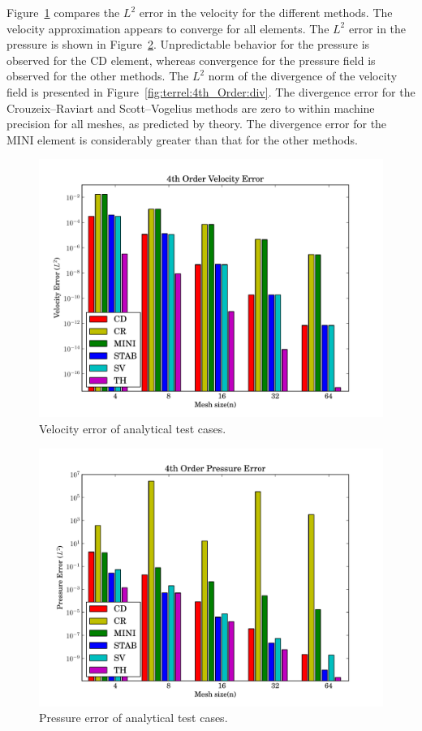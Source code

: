 Figure~\ref{fig:terrel:4th_Order:vel} compares the $L^{2}$ error in the
velocity for the different methods. The velocity approximation appears
to converge for all elements.  The $L^{2}$ error in the pressure is
shown in Figure~\ref{fig:terrel:4th_Order:press}.  Unpredictable
behavior for the pressure is observed for the CD element, whereas
convergence for the pressure field is observed for the other methods.
The $L^{2}$ norm of the divergence of the velocity field is presented
in Figure~\ref{fig:terrel:4th_Order:div}.  The divergence error for the
Crouzeix--Raviart and Scott--Vogelius methods are zero to within machine
precision for all meshes, as predicted by theory. The divergence error for
the MINI element is considerably greater than that for the other methods.

\begin{figure}
  \center\includegraphics[width=\largefig]{chapters/terrel/pdf/vel_4.pdf}
  \caption{Velocity error of analytical test cases.}
    \label{fig:terrel:4th_Order:vel}
\end{figure}

\begin{figure}
  \center \includegraphics[width=\largefig]{chapters/terrel/pdf/press_4.pdf}
  \caption{Pressure error of analytical test cases.}
  \label{fig:terrel:4th_Order:press}
\end{figure}

